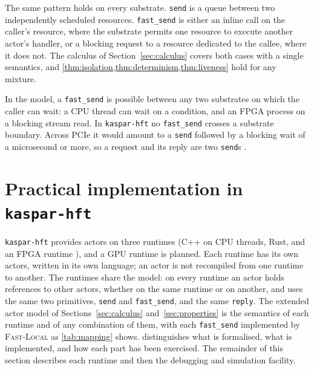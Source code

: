 \documentclass[11pt]{article}
\theoremstyle{definition}
\theoremstyle{remark}
\newcommand{\fs}{\texttt{fast\_send}}
\newcommand{\snd}{\texttt{send}}
\newcommand{\kh}{\texttt{kaspar-hft}}
\begin{document}
The same pattern holds on every substrate. \snd{} is a queue between two independently
scheduled resources. \fs{} is either an inline call on the caller's resource, where the
substrate permits one resource to execute another actor's handler, or a blocking request
to a resource dedicated to the callee, where it does not. The calculus of
Section~\ref{sec:calculus} covers both cases with a single semantics, and
\cref{thm:isolation,thm:determinism,thm:liveness} hold for any mixture.

In the model, a \fs{} is possible between any two substrates on which the caller can
wait: a CPU thread can wait on a condition, and an FPGA process on a blocking stream
read. In \kh{} no \fs{} crosses a substrate boundary. Across PCIe it would amount to a
\snd{} followed by a blocking wait of a microsecond or more, so a request and its reply
are two \snd{}s \cite{fpgaactors}.

\section{Practical implementation in \kh{}}
\label{sec:impl}

\kh{} provides actors on three runtimes (C++ on CPU threads, Rust, and an FPGA runtime
\cite{fpgaactors}), and a GPU runtime is planned. Each runtime has its own actors,
written in its own language; an actor is not recompiled from one runtime to another. The
runtimes share the model: on every runtime an actor holds references to other actors,
whether on the same runtime or on another, and uses the same two primitives, \snd{} and
\fs{}, and the same \texttt{reply}. The extended actor model of
Sections~\ref{sec:calculus} and~\ref{sec:properties} is the semantics of each runtime and
of any combination of them, with each \fs{} implemented by \textsc{Fast-Local} as
\cref{tab:mapping} shows.  distinguishes what is formalised, what is
implemented, and how each part has been exercised. The remainder of this section
describes each runtime and then the debugging and simulation facility.
\end{document}
